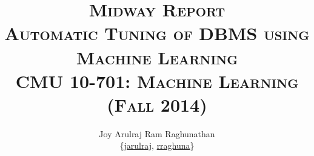 \documentclass[pageno]{jpaper}
\makeatletter
\newcommand{\email}[1]{\href{mailto:#1@cs.cmu.edu}{#1}}
\makeatother
\begin{document}
\title{
  \textsc{\LARGE Midway Report\\
  \Large Automatic Tuning of DBMS using Machine Learning\\
  \large CMU 10-701: Machine Learning (Fall 2014)}
}

\author{Joy Arulraj \hspace{0.1 in} Ram Raghunathan \hspace{0.1 in} \\
{\{\email{jarulraj}, \email{rraghuna}\}}}

\date{}
\maketitle












\end{document}
